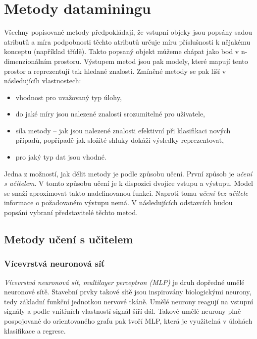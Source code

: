 \documentclass[thesis=M,czech]{FITthesis}[2012/06/26]
\begin{document}
 \section{Metody dataminingu}
Všechny popisované metody předpokládají, že vstupní objeky jsou popsány sadou atributů a míra podpobnosti těchto atributů určuje míru příslušnosti k nějakému konceptu (například třídě). Takto popsaný objekt můžeme chápat jako bod v n-dimenzionálním prostoru. Výstupem metod jsou pak modely, které mapují tento prostor a reprezentují tak hledané znalosti.
Zmíněné metody se pak liší v následujícíh vlastnostech:


\begin{itemize}
\item vhodnost pro uvažovaný typ úlohy,
\item do jaké míry jsou nalezené znalosti srozumitelné pro uživatele,
\item síla metody -- jak jsou nalezené znalosti efektivní při klasifikaci nových případů, popřípadě jak složité shluky dokáží výsledky reprezentovat,
\item pro jaký typ dat jsou vhodné.
\end{itemize}


Jedna z možností, jak dělit metody je podle způsobu učení. První způsob je \textit{učení s učitelem}. V tomto způsobu učení je k dispozici dvojice vstupu a výstupu. Model se snaží aproximovat takto nadefinovanou funkci. Naproti tomu \textit{učení bez učitele} informace o požadovaném výstupu nemá. V následujících odstavcích budou popsáni vybraní představitelé těchto metod.\cite{eurokomise}

 \subsection{Metody učení s učitelem}
  \subsubsection*{Vícevrstvá neuronová síť}
    \textit{Vícevrstvá neuronová síť, multilayer perceptron (MLP)} je druh dopředné umělé neuronové sítě.
Stavební prvky takové sítě jsou inspirovány biologickými neurony, tedy základní funkční jednotkou nervové tkáně. Umělé neurony reagují na vstupní signály a podle vnitřních vlastností signál šíří dál. Takové umělé neurony plně pospojované do orientovaného grafu pak tvoří MLP, která je využitelná v úlohách klasifikace a regrese. 
\end{document}
